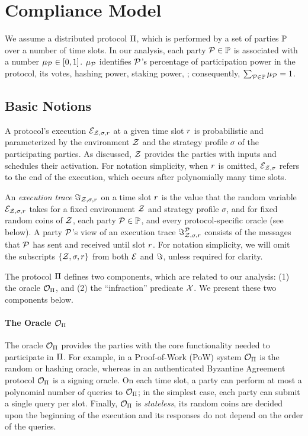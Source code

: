 \section{Compliance Model}\label{sec:model}

We assume a distributed protocol $\Pi$, which is performed by a set of
parties $\mathbb{P}$ over a number of time slots.
In our analysis, each party $\mathcal{P} \in \mathbb{P}$ is associated with
a number $\mu_{\mathcal{P}} \in [0, 1]$. $\mu_{\mathcal{P}}$ identifies
$\mathcal{P}$'s percentage of participation power in the protocol, \eg its votes,
hashing power, staking power, \etc; consequently, $\sum_{\mathcal{P} \in \mathbb{P}}
\mu_{\mathcal{P}} = 1$.

\subsection{Basic Notions}\label{subsec:basic}
A protocol's execution $\mathcal{E}_{\mathcal{Z}, \sigma, r}$ at a given time slot
$r$ is probabilistic and parameterized by the environment $\mathcal{Z}$ and the
strategy profile $\sigma$ of the participating parties. As discussed, $\mathcal{Z}$
provides the parties with inputs and schedules their activation. For notation
simplicity, when $r$ is omitted, $\mathcal{E}_{\mathcal{Z}, \sigma}$ refers to the
end of the execution, which occurs after polynomially many time slots.

An \emph{execution trace} $\Im_{\mathcal{Z}, \sigma, r}$ on a time slot
$r$ is the value that the random variable $\mathcal{E}_{\mathcal{Z}, \sigma, r}$ takes for a fixed
environment $\mathcal{Z}$ and strategy profile $\sigma$, and for fixed random coins of
$\mathcal{Z}$, each party $\mathcal{P} \in \mathbb{P}$, and every
protocol-specific oracle (see below). A party $\mathcal{P}$'s view of an
execution trace $\Im_{\mathcal{Z}, \sigma, r}^{\mathcal{P}}$ consists of
the messages that $\mathcal{P}$ has sent and received until slot $r$. For
notation simplicity, we will omit the subscripts $\{ \mathcal{Z},
\sigma, r \}$ from both $\mathcal{E}$ and $\Im$, unless
required for clarity.\smallskip

The protocol $\Pi$ defines two components, which are related to our
analysis: (1) the oracle $\mathcal{O}_\Pi$, and (2) the ``infraction'' predicate
$\mathcal{X}$. We present these two components below.

\paragraph{The Oracle $\mathcal{O}_\Pi$}
The oracle $\mathcal{O}_\Pi$ provides the parties with the core functionality
needed to participate in $\Pi$. For example, in a Proof-of-Work (PoW) system
$\mathcal{O}_\Pi$ is the random or hashing oracle, whereas in an authenticated
Byzantine Agreement protocol $\mathcal{O}_\Pi$ is a signing oracle. On each time
slot, a party can perform at most a polynomial number of queries to
$\mathcal{O}_\Pi$; in the simplest case, each party can submit a single query
per slot. Finally, $\mathcal{O}_\Pi$ is \emph{stateless}, \ie its random coins
are decided upon the beginning of the execution and its responses do not depend
on the order of the queries.

